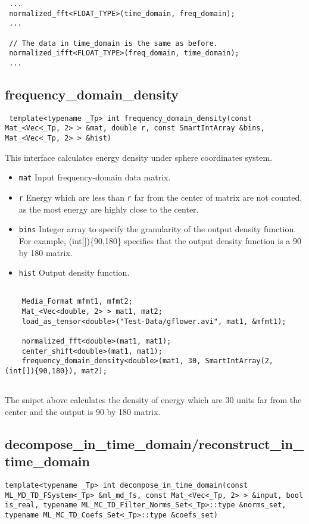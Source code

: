 \documentclass[a4paper,5pt]{article}
\begin{document}
\begin{lstlisting}
 ...
 normalized_fft<FLOAT_TYPE>(time_domain, freq_domain);
 ...
 
 // The data in time_domain is the same as before.
 normalized_ifft<FLOAT_TYPE>(freq_domain, time_domain);
 ...

\end{lstlisting}

\subsection{frequency\_domain\_density}

\lstinline{ template<typename _Tp> int frequency_domain_density(const Mat_<Vec<_Tp, 2> > &mat, double r, const SmartIntArray &bins, Mat_<Vec<_Tp, 2> > &hist) }

This interface calculates energy density under sphere coordinates system.

\begin{itemize}
\item \lstinline{mat} Input frequency-domain data matrix.
\item \lstinline{r} Energy which are less than \lstinline{r} far from the center of matrix are not counted, as the most energy are highly close to the center.
\item \lstinline{bins} Integer array to specify the granularity of the output density function. For example, (int[])\{90,180\} specifies that the output density function is a 90 by 180 matrix.
\item \lstinline{hist} Output density function.
\end{itemize}

\begin{lstlisting}

	Media_Format mfmt1, mfmt2;
	Mat_<Vec<double, 2> > mat1, mat2;
	load_as_tensor<double>("Test-Data/gflower.avi", mat1, &mfmt1);

	normalized_fft<double>(mat1, mat1);
	center_shift<double>(mat1, mat1);
	frequency_domain_density<double>(mat1, 30, SmartIntArray(2, (int[]){90,180}), mat2);
	
\end{lstlisting}

The snipet above calculates the density of energy which are 30 units far from the center and the output is 90 by 180 matrix.

\subsection{decompose\_in\_time\_domain/reconstruct\_in\_time\_domain}
\lstinline{template<typename _Tp> int decompose_in_time_domain(const ML_MD_TD_FSystem<_Tp> &ml_md_fs, const Mat_<Vec<_Tp, 2> > &input, bool is_real, typename ML_MC_TD_Filter_Norms_Set<_Tp>::type &norms_set, typename ML_MC_TD_Coefs_Set<_Tp>::type &coefs_set) }
\end{document}
